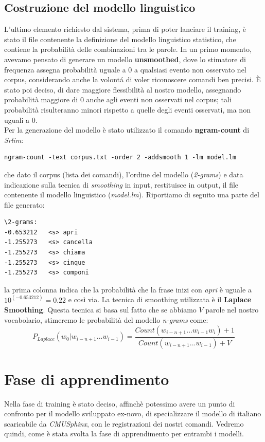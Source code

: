 \documentclass[12pt]{article}
\begin{document}
    \subsection{Costruzione del modello linguistico}
    L'ultimo elemento richiesto dal sistema, prima di poter lanciare il training, è stato il file contenente la definizione del modello linguistico statistico, che contiene la probabilità delle combinazioni tra le parole. In un primo momento, avevamo pensato di generare un modello \textbf{unsmoothed}, dove lo stimatore di frequenza assegna probabilità uguale a $0$ a qualsiasi evento non osservato nel corpus, considerando anche la volontá di voler riconoscere comandi ben precisi. È stato poi deciso, di dare maggiore flessibilità al nostro modello, assegnando probabilità maggiore di $0$ anche agli eventi non osservati nel corpus; tali probabilità risulteranno minori rispetto a quelle degli eventi osservati, ma non uguali a $0$.\\     
    Per la generazione del modello è stato utilizzato il comando \textbf{ngram-count} di \textit{Srlim}:
    \begin{lstlisting}
ngram-count -text corpus.txt -order 2 -addsmooth 1 -lm model.lm
    \end{lstlisting} 
    che dato il corpus (lista dei comandi), l'ordine del modello (\textit{2-grams}) e data indicazione sulla tecnica di \textit{smoothing} in input, restituisce in output, il file contenente il modello linguistico (\textit{model.lm}).
    Riportiamo di seguito una parte del file generato:
    \begin{lstlisting}
\2-grams:
-0.653212	<s> apri
-1.255273	<s> cancella
-1.255273	<s> chiama
-1.255273	<s> cinque
-1.255273	<s> componi    
    \end{lstlisting} 
   la prima colonna indica che la probabilità che la frase inizi con \textit{apri} è uguale a \\ $10^{(-0.653212)} = 0.22$ e così via.
    La tecnica di smoothing utilizzata è il \textbf{Laplace Smoothing}. Questa tecnica si basa sul fatto che se abbiamo $V$ parole nel nostro vocabolario, stimeremo le probabilità del modello \textit{n-grams} come:  
    \begin{equation} 
        P_{Laplace} (w_{0}|w_{i-n+1}...w_{i-1}) = \frac{Count(w_{i-n+1}...w_{i-1}w_{i})+1}{Count(w_{i-n+1}...w_{i-1})+V} 
    \end{equation}
   
\newpage
\section{Fase di apprendimento}
Nella fase di training è stato deciso, affinchè potessimo avere un punto di confronto per il modello sviluppato ex-novo, di specializzare il modello di italiano scaricabile da \textit{CMUSphinx}, con le registrazioni dei nostri comandi.
Vedremo quindi, come è stata svolta la fase di apprendimento per entrambi i modelli.
\end{document}
